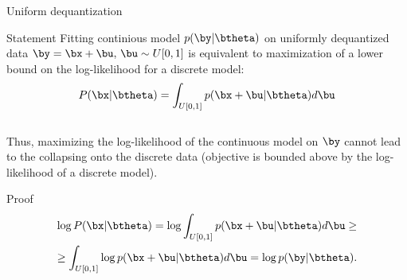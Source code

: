 \begin{frame}{Uniform dequantization}
	\begin{block}{Statement}
		Fitting continious model $p(\by | \btheta)$ on uniformly dequantized data $\by = \bx + \bu, \, \bu \sim U[0, 1]$ is equivalent to maximization of a lower bound on the log-likelihood for a discrete model:
		\[
		P(\bx | \btheta) = \int_{U[0, 1]} p(\bx + \bu | \btheta) d \bu
		\]
		\vspace{-0.2cm} \\
		Thus, maximizing the log-likelihood of the continuous model on $\by$ cannot lead to the collapsing onto the discrete data (objective is bounded above by the log-likelihood of a discrete model).
	\end{block}
	\begin{block}{Proof}
		\vspace{-1cm}
		\begin{multline*}
			 \log P(\bx | \btheta) = \log \int_{U[0, 1]} p(\bx + \bu | \btheta) d \bu \geq \\ \geq \int_{U[0, 1]} \log p(\bx + \bu | \btheta) d \bu = \log p(\by | \btheta).
		\end{multline*}
	\end{block}
\end{frame}

